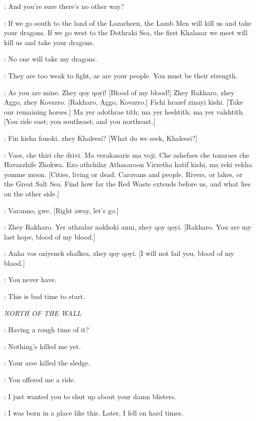 \DAENERYS: And you're sure there's no other way?

\JORAH: If we go south to the land of the Lazarheen, the Lamb Men will kill us and take your dragons. If we go west to the Dothraki Sea, the first Khalasar we meet will kill us and take your dragons.

\DAENERYS: No one will take my dragons.

\JORAH: They are too weak to fight, as are your people. You must be their strength.

\DAENERYS: As you are mine.  Zhey qoy qoyi! [Blood of my blood!] Zhey Rakharo, zhey Aggo, zhey Kovarro. [Rakharo, Aggo, Kovarro.] Fichi hrazef zinayi kishi. [Take our remaining horses.] Ma yer adothrae tith; ma yer heshtith; ma yer valshtith. [You ride east; you southeast; and you northeast.]

\RAKHARO: Fin kisha fonoki, zhey Khaleesi? [What do we seek, Khaleesi?]

\DAENERYS: Vaes, che thiri che drivi. Ma verakasaris ma voji. Che ashefaes che tozaraes che Havazzhife Zhokwa. Ezo athchilar Athasaroon Virzetha hatif kishi, ma reki vekha yomme moon. [Cities, living or dead. Caravans and people. Rivers, or lakes, or the Great Salt Sea. Find how far the Red Waste extends before us, and what lies on the other side.]

\RAKHARO: Varanno, gwe. [Right away, let's go.]

\DAENERYS: Zhey Rakharo. Yer athzalar nakhoki anni, zhey qoy qoyi. [Rakharo. You are my last hope, blood of my blood.]

\RAKHARO: Anha vos oziyenek shafkea, zhey qoy qoyi. [I will not fail you, blood of my blood.]

\DAENERYS: You never have.

\RAKHARO: This is bad time to start.


\scene

\textit{NORTH OF THE WALL}


\JON: Having a rough time of it?

\SAM: Nothing's killed me yet.

\GRENN: Your arse killed the sledge.

\SAM: You offered me a ride.

\GRENN: I just wanted you to shut up about your damn blisters.

\EDD: I was born in a place like this. Later, I fell on hard times.

